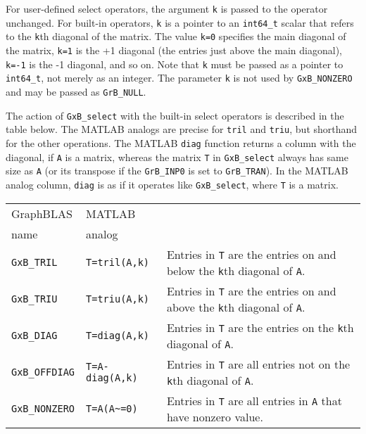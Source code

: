 \documentclass[12pt]{article}
\begin{document}
For user-defined select operators, the argument \verb'k' is passed to the
operator unchanged.  For built-in operators, \verb'k' is a pointer to an
\verb'int64_t' scalar that refers to the \verb'k'th diagonal of the matrix.
The value \verb'k=0' specifies the main diagonal of the matrix, \verb'k=1' is
the +1 diagonal (the entries just above the main diagonal), \verb'k=-1' is the
-1 diagonal, and so on.  Note that \verb'k' must be passed as a pointer to
\verb'int64_t', not merely as an integer.  The parameter \verb'k' is not used
by \verb'GxB_NONZERO' and may be passed as \verb'GrB_NULL'.

The action of \verb'GxB_select' with the built-in select operators is described
in the table below.  The MATLAB analogs are precise for \verb'tril' and
\verb'triu', but shorthand for the other operations.  The MATLAB \verb'diag'
function returns a column with the diagonal, if \verb'A' is a matrix, whereas
the matrix \verb'T' in \verb'GxB_select' always has same size as \verb'A' (or
its transpose if the \verb'GrB_INP0' is set to \verb'GrB_TRAN').  In the MATLAB
analog column, \verb'diag' is as if it operates like \verb'GxB_select', where
\verb'T' is a matrix.

\vspace{0.2in}
{\small
\begin{tabular}{llp{3in}}
\hline
GraphBLAS               & MATLAB            & \\
name                   & analog            & \\
\hline
\verb'GxB_TRIL'         & \verb'T=tril(A,k)'   &
    Entries in \verb'T' are the entries on and below the \verb'k'th diagonal of \verb'A'. \\
\verb'GxB_TRIU'         & \verb'T=triu(A,k)'   & 
    Entries in \verb'T' are the entries on and above the \verb'k'th diagonal of \verb'A'. \\
\verb'GxB_DIAG'         & \verb'T=diag(A,k)'   & 
    Entries in \verb'T' are the entries on the \verb'k'th diagonal of \verb'A'. \\
\verb'GxB_OFFDIAG'      & \verb'T=A-diag(A,k)' & 
    Entries in \verb'T' are all entries not on the \verb'k'th diagonal of \verb'A'. \\
\verb'GxB_NONZERO'      & \verb'T=A(A~=0)'     & 
    Entries in \verb'T' are all entries in \verb'A' that have nonzero value. \\
\hline
\end{tabular}
}
\vspace{0.2in}
\end{document}
